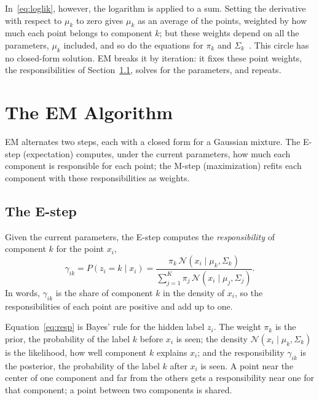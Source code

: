 \documentclass[11pt,a4paper]{amsart}
\numberwithin{equation}{section}
\theoremstyle{plain}
\theoremstyle{definition}
\theoremstyle{remark}
\newcommand{\N}{\mathcal{N}}
\newcommand{\given}{\mid}
\begin{document}
In~\eqref{eq:loglik}, however, the logarithm is applied to a sum.
Setting the derivative with respect to $\mu_k$ to zero gives $\mu_k$ as
an average of the points, weighted by how much each point belongs to
component $k$; but these weights depend on all the parameters, $\mu_k$
included, and so do the equations for $\pi_k$
and $\Sigma_k$~\cite[Section~9.2]{bishop2006}. This circle has no
closed-form solution. EM breaks it by iteration: it fixes these point
weights, the responsibilities of Section~\ref{sec:estep}, solves for the
parameters, and repeats.

\section{The EM Algorithm}\label{sec:em}

EM alternates two steps, each with a closed form for a Gaussian
mixture. The E-step (expectation) computes, under the current
parameters, how much each component is responsible for each point; the
M-step (maximization) refits each component with these
responsibilities as weights.

\subsection{The E-step}\label{sec:estep}

Given the current parameters, the E-step computes the
\emph{responsibility} of component $k$ for the point $x_i$,
\begin{equation}\label{eq:resp}
  \gamma_{ik} = P(z_i = k \given x_i)
  = \frac{\pi_k\, \N(x_i \given \mu_k, \Sigma_k)}
         {\sum_{j=1}^{K} \pi_j\, \N(x_i \given \mu_j, \Sigma_j)} .
\end{equation}
In words, $\gamma_{ik}$ is the share of component $k$ in the density of
$x_i$, so the responsibilities of each point are positive and add up to
one.

Equation~\eqref{eq:resp} is Bayes' rule for the hidden label $z_i$. The
weight $\pi_k$ is the prior, the probability of the label $k$ before
$x_i$ is seen; the density $\N(x_i \given \mu_k, \Sigma_k)$ is the
likelihood, how well component $k$ explains $x_i$; and the
responsibility $\gamma_{ik}$ is the posterior, the probability of the
label $k$ after $x_i$ is seen. A point near the center of one component
and far from the others gets a responsibility near one for that
component; a point between two components is shared.
\end{document}
